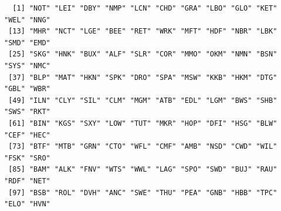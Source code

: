 \documentclass[
  letterpaper,
  DIV=11,
  numbers=noendperiod]{scrreprt}
\newenvironment{Shaded}{\begin{snugshade}}{\end{snugshade}}
\newcommand{\AttributeTok}[1]{\textcolor[rgb]{0.40,0.45,0.13}{#1}}
\newcommand{\DecValTok}[1]{\textcolor[rgb]{0.68,0.00,0.00}{#1}}
\newcommand{\FunctionTok}[1]{\textcolor[rgb]{0.28,0.35,0.67}{#1}}
\newcommand{\NormalTok}[1]{\textcolor[rgb]{0.00,0.23,0.31}{#1}}
\newcommand{\OtherTok}[1]{\textcolor[rgb]{0.00,0.23,0.31}{#1}}
\newcommand{\SpecialCharTok}[1]{\textcolor[rgb]{0.37,0.37,0.37}{#1}}
\newcommand{\StringTok}[1]{\textcolor[rgb]{0.13,0.47,0.30}{#1}}
\begin{document}
\begin{Shaded}
\end{Shaded}

\begin{verbatim}
  [1] "NOT" "LEI" "DBY" "NMP" "LCN" "CHD" "GRA" "LBO" "GLO" "KET" "WEL" "NNG"
 [13] "MHR" "NCT" "LGE" "BEE" "RET" "WRK" "MFT" "HDF" "NBR" "LBK" "SMD" "EMD"
 [25] "SKG" "HNK" "BUX" "ALF" "SLR" "COR" "MMO" "OKM" "NMN" "BSN" "SYS" "NMC"
 [37] "BLP" "MAT" "HKN" "SPK" "DRO" "SPA" "MSW" "KKB" "HKM" "DTG" "GBL" "WBR"
 [49] "ILN" "CLY" "SIL" "CLM" "MGM" "ATB" "EDL" "LGM" "BWS" "SHB" "SWS" "RKT"
 [61] "BIN" "KGS" "SXY" "LOW" "TUT" "MKR" "HOP" "DFI" "HSG" "BLW" "CEF" "HEC"
 [73] "BTF" "MTB" "GRN" "CTO" "WFL" "CMF" "AMB" "NSD" "CWD" "WIL" "FSK" "SRO"
 [85] "BAM" "ALK" "FNV" "WTS" "WWL" "LAG" "SPO" "SWD" "BUJ" "RAU" "RDF" "NET"
 [97] "BSB" "ROL" "DVH" "ANC" "SWE" "THU" "PEA" "GNB" "HBB" "TPC" "ELO" "HVN"
\end{verbatim}

\begin{Shaded}
\end{Shaded}
\end{document}
